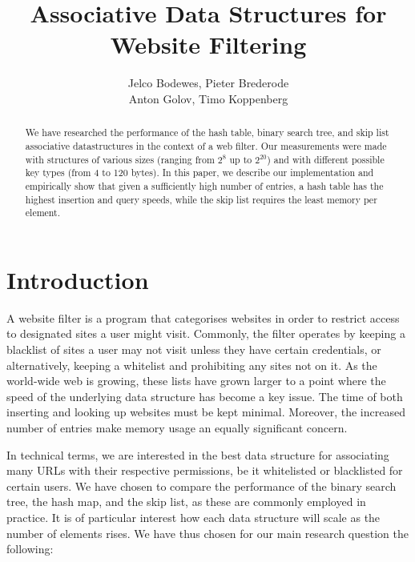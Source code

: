 \documentclass[12pt,a4paper]{article}
\title{Associative Data Structures for Website Filtering}
\author{Jelco Bodewes, Pieter Brederode \\ Anton Golov, Timo Koppenberg }
\begin{document}
    \maketitle

    \begin{abstract}
        We have researched the performance of the hash table, binary search tree, and skip list
        associative datastructures in the context of a web filter.  Our measurements were made with
        structures of various sizes (ranging from $2^8$ up to $2^{20}$) and with different possible
        key types (from 4 to 120 bytes).  In this paper, we describe our implementation and
        empirically show that given a sufficiently high number of entries, a hash table has the
        highest insertion and query speeds, while the skip list requires the least memory per
        element.
    \end{abstract}


    \section{Introduction}
    A website filter is a program that categorises websites in order to restrict access to
    designated sites a user might visit. Commonly, the filter operates by keeping a blacklist of
    sites a user may not visit unless they have certain credentials, or alternatively, keeping a
    whitelist and prohibiting any sites not on it.  As the world-wide web is growing, these lists
    have grown larger to a point where the speed of the underlying data structure has become a key
    issue.  The time of both inserting and looking up websites must be kept minimal. Moreover, the
    increased number of entries make memory usage an equally significant concern.

    In technical terms, we are interested in the best data structure for associating many URLs with
    their respective permissions, be it whitelisted or blacklisted for certain users.  We have
    chosen to compare the performance of the binary search tree, the hash map, and the skip list, as
    these are commonly employed in practice.  It is of particular interest how each data structure
    will scale as the number of elements rises.  We have thus chosen for our main research question
    the following:
\end{document}
